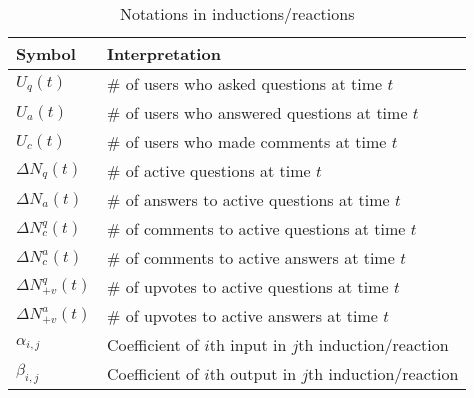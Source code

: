 \begin{table}[hbt]
	\centering
	\begin{tabular}{|l|l|}
	\hline
	\textbf{Symbol} & \textbf{Interpretation}\\ \hline
	$U_q(t)$ & \# of users who asked questions at time $t$\\ \hline
	$U_a(t)$ & \# of users who answered questions at time $t$\\ \hline
	$U_c(t)$ & \# of users who made comments at time $t$\\ \hline
	$\Delta N_q(t)$ & \# of active questions at time $t$\\ \hline
	$\Delta N_a(t)$ & \# of answers to active questions at time $t$\\ \hline
	$\Delta N_c^q(t)$ & \# of comments to active questions at time $t$\\ \hline
	$\Delta N_c^a(t)$ & \# of comments to active answers at time $t$\\ \hline
	$\Delta N_{+v}^q(t)$ & \# of upvotes to active questions at time $t$\\ \hline
	$\Delta N_{+v}^a(t)$ & \# of upvotes to active answers at time $t$\\ \hline
	$\alpha_{i, j}$ & Coefficient of $i$th input in $j$th induction/reaction\\ \hline
	$\beta_{i, j}$ & Coefficient of $i$th output in $j$th induction/reaction\\ \hline
	 \end{tabular}
    \caption{Notations in inductions/reactions}
\end{table}

